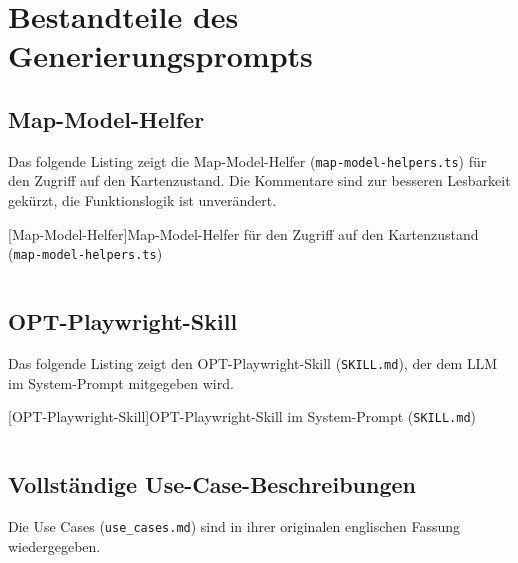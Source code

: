 ﻿\section{Bestandteile des Generierungsprompts}
\label{app:bestandteile-generierungsprompt}

\subsection{Map-Model-Helfer}
\label{app:map-model-helpers}

Das folgende Listing zeigt die Map-Model-Helfer (\texttt{map-model-helpers.ts}) für den Zugriff auf den Kartenzustand. Die Kommentare sind zur besseren Lesbarkeit gekürzt, die Funktionslogik ist unverändert.

\begingroup
{}[Map-Model-Helfer]{Map-Model-Helfer für den Zugriff auf den Kartenzustand (\texttt{map-model-helpers.ts})}
\label{lst:map-model-helpers}
\endgroup
\nopagebreak
\inputminted{typescript}{Quellcode/map-model-helpers.ts}

\subsection{OPT-Playwright-Skill}
\label{app:opt-playwright-skill}

Das folgende Listing zeigt den OPT-Playwright-Skill (\texttt{SKILL.md}), der dem \ac{LLM} im System-Prompt mitgegeben wird.

\begingroup
{}[OPT-Playwright-Skill]{OPT-Playwright-Skill im System-Prompt (\texttt{SKILL.md})}
\label{lst:opt-playwright-skill}
\endgroup
\nopagebreak
\inputminted{markdown}{Quellcode/SKILL.md}

\subsection{Vollständige Use-Case-Beschreibungen}
\label{app:use-cases}

Die Use Cases (\texttt{use\_cases.md}) sind in ihrer originalen englischen Fassung wiedergegeben.

